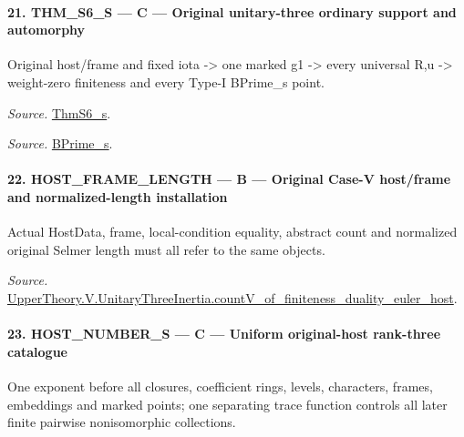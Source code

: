 \paragraph{21. THM\_\allowbreak S6\_\allowbreak S — C — Original unitary-three ordinary support and automorphy}

Original host/frame and fixed iota -> one marked g1 -> every universal R,u -> weight-zero finiteness and every Type-I BPrime\_\allowbreak s point.

\emph{Source.} \href{https://github.com/CocoSgt/riemann-hypothesis-lean/blob/7cbf7a0c32fca1badf05931879a37c3f8a2b03b4/src/Development/AutomorphicArithmetic/AutomorphicVarieties/ModularityArgument/ThresholdArguments/DenseThresholdCases/ThmS6CoreS.lean#L17-L26}{ThmS6\_\allowbreak s}.

\emph{Source.} \href{https://github.com/CocoSgt/riemann-hypothesis-lean/blob/7cbf7a0c32fca1badf05931879a37c3f8a2b03b4/src/Development/AutomorphicArithmetic/AutomorphicVarieties/ModularityArgument/ThresholdArguments/DenseThresholdCases/ThmS6CoreS.lean#L12-L16}{BPrime\_\allowbreak s}.



\paragraph{22. HOST\_\allowbreak FRAME\_\allowbreak LENGTH — B — Original Case-V host/frame and normalized-length installation}

Actual HostData, frame, local-condition equality, abstract count and normalized original Selmer length must all refer to the same objects.

\emph{Source.} \href{https://github.com/CocoSgt/riemann-hypothesis-lean/blob/7cbf7a0c32fca1badf05931879a37c3f8a2b03b4/src/Development/AutomorphicArithmetic/AutomorphicVarieties/ModularityArgument/ThresholdArguments/DenseThresholdCases/CountVOf.lean#L33-L60}{UpperTheory.V.UnitaryThreeInertia.countV\_\allowbreak of\_\allowbreak finiteness\_\allowbreak duality\_\allowbreak euler\_\allowbreak host}.



\paragraph{23. HOST\_\allowbreak NUMBER\_\allowbreak S — C — Uniform original-host rank-three catalogue}

One exponent before all closures, coefficient rings, levels, characters, frames, embeddings and marked points; one separating trace function controls all later finite pairwise nonisomorphic collections.

